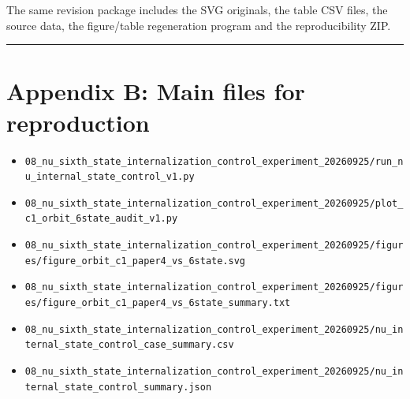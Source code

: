 \documentclass[
  a4paper,
]{article}
\providecommand{\tightlist}{%
  \setlength{\itemsep}{0pt}\setlength{\parskip}{0pt}}
\begin{document}
The same revision package includes the SVG originals, the table CSV
files, the source data, the figure/table regeneration program and the
reproducibility ZIP.

\begin{center}\rule{0.5\linewidth}{0.5pt}\end{center}

\section{Appendix B: Main files for
reproduction}\label{appendix-b-main-files-for-reproduction}

\begin{itemize}
\tightlist
\item
  \texttt{08\_\allowbreak{}nu\_\allowbreak{}sixth\_\allowbreak{}state\_\allowbreak{}internalization\_\allowbreak{}control\_\allowbreak{}experiment\_\allowbreak{}20260925/\allowbreak{}run\_\allowbreak{}nu\_\allowbreak{}internal\_\allowbreak{}state\_\allowbreak{}control\_\allowbreak{}v1.py}
\item
  \texttt{08\_\allowbreak{}nu\_\allowbreak{}sixth\_\allowbreak{}state\_\allowbreak{}internalization\_\allowbreak{}control\_\allowbreak{}experiment\_\allowbreak{}20260925/\allowbreak{}plot\_\allowbreak{}c1\_\allowbreak{}orbit\_\allowbreak{}6state\_\allowbreak{}audit\_\allowbreak{}v1.py}
\item
  \texttt{08\_\allowbreak{}nu\_\allowbreak{}sixth\_\allowbreak{}state\_\allowbreak{}internalization\_\allowbreak{}control\_\allowbreak{}experiment\_\allowbreak{}20260925/\allowbreak{}figures/\allowbreak{}figure\_\allowbreak{}orbit\_\allowbreak{}c1\_\allowbreak{}paper4\_\allowbreak{}vs\_\allowbreak{}6state.svg}
\item
  \texttt{08\_\allowbreak{}nu\_\allowbreak{}sixth\_\allowbreak{}state\_\allowbreak{}internalization\_\allowbreak{}control\_\allowbreak{}experiment\_\allowbreak{}20260925/\allowbreak{}figures/\allowbreak{}figure\_\allowbreak{}orbit\_\allowbreak{}c1\_\allowbreak{}paper4\_\allowbreak{}vs\_\allowbreak{}6state\_\allowbreak{}summary.txt}
\item
  \texttt{08\_\allowbreak{}nu\_\allowbreak{}sixth\_\allowbreak{}state\_\allowbreak{}internalization\_\allowbreak{}control\_\allowbreak{}experiment\_\allowbreak{}20260925/\allowbreak{}nu\_\allowbreak{}internal\_\allowbreak{}state\_\allowbreak{}control\_\allowbreak{}case\_\allowbreak{}summary.csv}
\item
  \texttt{08\_\allowbreak{}nu\_\allowbreak{}sixth\_\allowbreak{}state\_\allowbreak{}internalization\_\allowbreak{}control\_\allowbreak{}experiment\_\allowbreak{}20260925/\allowbreak{}nu\_\allowbreak{}internal\_\allowbreak{}state\_\allowbreak{}control\_\allowbreak{}summary.json}

\end{itemize}
\end{document}
